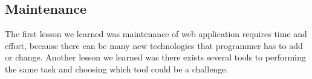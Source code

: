 \subsection{Maintenance}

The first lesson we learned was maintenance of web application requires time and effort, because there can be many new technologies that programmer has to add or change. 
Another lesson we learned was there exists several tools to performing the same task and choosing which tool could be a challenge. 



